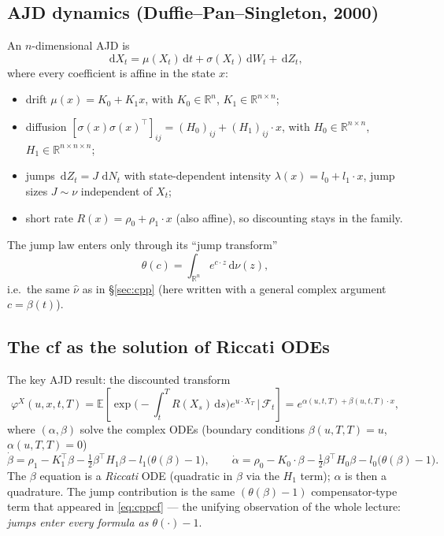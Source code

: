 \documentclass[11pt]{article}
\newcommand{\R}{\mathbb{R}}
\newcommand{\E}{\mathbb{E}}
\newcommand{\dd}{\,\mathrm{d}}
\newcommand{\ch}{\varphi}
\begin{document}
\subsection{AJD dynamics (Duffie--Pan--Singleton, 2000)}
An $n$-dimensional AJD is
\[
\dd X_t=\mu(X_t)\dd t+\sigma(X_t)\dd W_t+\dd Z_t,
\]
where every coefficient is affine in the state $x$:
\begin{itemize}[topsep=2pt,itemsep=1pt]
  \item drift $\mu(x)=K_0+K_1x$, with $K_0\in\R^n$, $K_1\in\R^{n\times n}$;
  \item diffusion $[\sigma(x)\sigma(x)^{\!\top}]_{ij}=(H_0)_{ij}+(H_1)_{ij}\cdot x$, with
  $H_0\in\R^{n\times n}$, $H_1\in\R^{n\times n\times n}$;
  \item jumps $\dd Z_t=J\,\dd N_t$ with state-dependent intensity $\lambda(x)=l_0+l_1\cdot x$, jump sizes
  $J\sim\nu$ independent of $X_t$;
  \item short rate $R(x)=\rho_0+\rho_1\cdot x$ (also affine), so discounting stays in the family.
\end{itemize}
The jump law enters only through its ``jump transform''
\[
\theta(c)=\int_{\R^n}e^{c\cdot z}\dd\nu(z),
\]
i.e.\ the same $\widehat\nu$ as in \S\ref{sec:cpp} (here written with a general complex argument $c=\beta(t)$).

\subsection{The cf as the solution of Riccati ODEs}
The key AJD result: the discounted transform
\[
\ch^{X}(u,x,t,T)=\E\!\left[\exp\!\Big(-\!\int_t^T R(X_s)\dd s\Big)e^{u\cdot X_T}\,\Big|\,\mathcal F_t\right]
=e^{\alpha(u,t,T)+\beta(u,t,T)\cdot x},
\]
where $(\alpha,\beta)$ solve the complex ODEs (boundary conditions $\beta(u,T,T)=u$, $\alpha(u,T,T)=0$)
\[
\dot\beta=\rho_1-K_1^{\!\top}\beta-\tfrac12\beta^{\!\top}H_1\beta-l_1\big(\theta(\beta)-1\big),\qquad
\dot\alpha=\rho_0-K_0\cdot\beta-\tfrac12\beta^{\!\top}H_0\beta-l_0\big(\theta(\beta)-1\big).
\]
The $\beta$ equation is a \emph{Riccati} ODE (quadratic in $\beta$ via the $H_1$ term); $\alpha$ is then
a quadrature. The jump contribution is the same $(\theta(\beta)-1)$ compensator-type term that appeared in
\eqref{eq:cppcf} --- the unifying observation of the whole lecture: \emph{jumps enter every formula as
$\theta(\cdot)-1$}.
\end{document}
